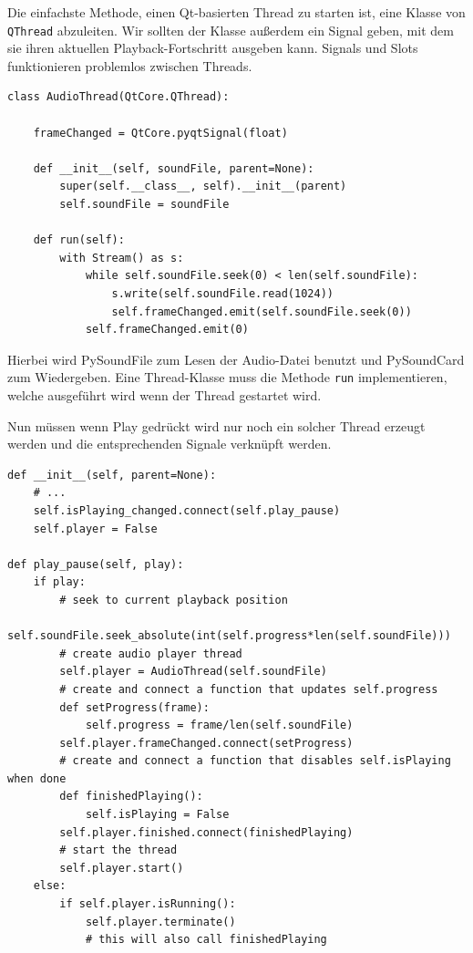 \documentclass[a4paper]{article}
\begin{document}
Die einfachste Methode, einen Qt-basierten Thread zu starten ist, eine Klasse von \verb~QThread~ abzuleiten. Wir sollten der Klasse außerdem ein Signal geben, mit dem sie ihren aktuellen Playback-Fortschritt ausgeben kann. Signals und Slots funktionieren problemlos zwischen Threads.

\begin{verbatim}
class AudioThread(QtCore.QThread):

    frameChanged = QtCore.pyqtSignal(float)

    def __init__(self, soundFile, parent=None):
        super(self.__class__, self).__init__(parent)
        self.soundFile = soundFile

    def run(self):
        with Stream() as s:
            while self.soundFile.seek(0) < len(self.soundFile):
                s.write(self.soundFile.read(1024))
                self.frameChanged.emit(self.soundFile.seek(0))
            self.frameChanged.emit(0)
\end{verbatim}

Hierbei wird PySoundFile zum Lesen der Audio-Datei benutzt und PySoundCard zum Wiedergeben. Eine Thread-Klasse muss die Methode \verb~run~ implementieren, welche ausgeführt wird wenn der Thread gestartet wird.

Nun müssen wenn Play gedrückt wird nur noch ein solcher Thread erzeugt werden und die entsprechenden Signale verknüpft werden.

\begin{verbatim}
def __init__(self, parent=None):
    # ...
    self.isPlaying_changed.connect(self.play_pause)
    self.player = False

def play_pause(self, play):
    if play:
        # seek to current playback position
        self.soundFile.seek_absolute(int(self.progress*len(self.soundFile)))
        # create audio player thread
        self.player = AudioThread(self.soundFile)
        # create and connect a function that updates self.progress
        def setProgress(frame):
            self.progress = frame/len(self.soundFile)
        self.player.frameChanged.connect(setProgress)
        # create and connect a function that disables self.isPlaying when done
        def finishedPlaying():
            self.isPlaying = False
        self.player.finished.connect(finishedPlaying)
        # start the thread
        self.player.start()
    else:
        if self.player.isRunning():
            self.player.terminate()
            # this will also call finishedPlaying
\end{verbatim}
\end{document}
